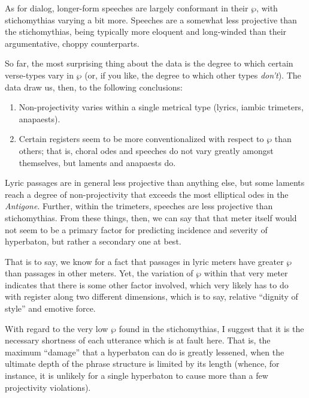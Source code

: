 \documentclass{article}
\newcommand{\FN}{\mathsf}
\begin{document}
As for dialog, longer-form speeches are largely conformant in their \ensuremath{\FN{\wp}},
with stichomythias varying a bit more. Speeches are a somewhat less projective
than the stichomythias, being typically more eloquent and long-winded than their
argumentative, choppy counterparts.

So far, the most surprising thing about the data is the degree to which certain
verse-types vary in \ensuremath{\FN{\wp}} (or, if you like, the degree to which other types
\emph{don't}). The data draw us, then, to the following conclusions:

\begin{enumerate}
\item Non-projectivity varies within a single metrical type (lyrics, iambic trimeters,
anapaests).

\item Certain registers seem to be more conventionalized with respect to \ensuremath{\FN{\wp}}
than others; that is, choral odes and speeches do not vary greatly amongst
themselves, but laments and anapaests do.
\end{enumerate}

\noindent
%
Lyric passages are in general less projective than anything else, but some
laments reach a degree of non-projectivity that exceeds the most elliptical odes
in the \emph{Antigone}. Further, within the trimeters, speeches are less projective
than stichomythias. From these things, then, we can say that that meter itself
would not seem to be a primary factor for predicting incidence and severity of
hyperbaton, but rather a secondary one at best.

That is to say, we know for a fact that passages in lyric meters have greater
\ensuremath{\FN{\wp}} than passages in other meters. Yet, the variation of \ensuremath{\FN{\wp}} within that
very meter indicates that there is some other factor involved, which very likely
has to do with register along two different dimensions, which is to say,
relative ``dignity of style'' and emotive force.

With regard to the very low \ensuremath{\FN{\wp}} found in the stichomythias, I suggest that
it is the necessary shortness of each utterance which is at fault here. That is,
the maximum ``damage'' that a hyperbaton can do is greatly lessened, when the
ultimate depth of the phrase structure is limited by its length (whence, for
instance, it is unlikely for a single hyperbaton to cause more than a few
projectivity violations).
\end{document}
